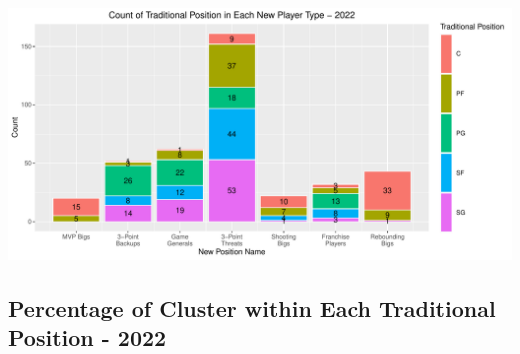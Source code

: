 \documentclass[
]{article}
\begin{document}
\includegraphics{Reclassifying-NBA-Player-Postions-Pt.-3---Clustering-Analysis-Results_files/figure-latex/unnamed-chunk-11-1.pdf}

\hypertarget{percentage-of-cluster-within-each-traditional-position---2022}{%
\subsection{Percentage of Cluster within Each Traditional Position -
2022}\label{percentage-of-cluster-within-each-traditional-position---2022}}
\end{document}
